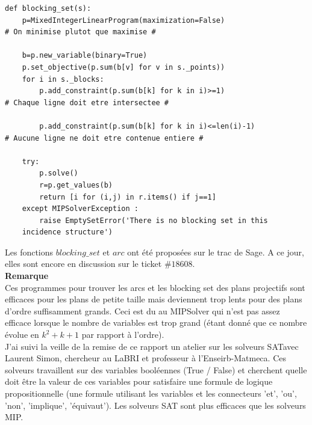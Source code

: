 \documentclass[a4paper]{article}
\begin{document}
\begin{lstlisting}
def blocking_set(s):
    p=MixedIntegerLinearProgram(maximization=False)
# On minimise plutot que maximise #

    b=p.new_variable(binary=True)
    p.set_objective(p.sum(b[v] for v in s._points))
    for i in s._blocks:
        p.add_constraint(p.sum(b[k] for k in i)>=1)
# Chaque ligne doit etre intersectee #

        p.add_constraint(p.sum(b[k] for k in i)<=len(i)-1)
# Aucune ligne ne doit etre contenue entiere #
        
    try:
        p.solve()
        r=p.get_values(b)
        return [i for (i,j) in r.items() if j==1]
    except MIPSolverException :
        raise EmptySetError('There is no blocking set in this
    incidence structure')  
\end{lstlisting}
\vspace{1\baselineskip}
Les fonctions $blocking\_set$ et $arc$ ont été proposées sur le trac de Sage. A ce jour, elles sont encore en discussion sur le ticket $\#18608$.\vspace{3\baselineskip}\\

\textbf{Remarque}\\
Ces programmes pour trouver les arcs et les blocking set des plans projectifs sont efficaces pour les plans de petite taille mais deviennent trop lents pour des plans d'ordre suffisamment grands. Ceci est du au MIPSolver qui n'est pas assez efficace lorsque le nombre de variables est trop grand (étant donné que ce nombre évolue en $k^2 + k + 1$ par rapport à l'ordre).\\
J'ai suivi la veille de la remise de ce rapport un atelier sur les solveurs SATavec Laurent Simon, chercheur au LaBRI et professeur à l'Enseirb-Matmeca. Ces solveurs travaillent sur des variables booléennes (True / False) et cherchent quelle doit être la valeur de ces variables pour satisfaire une formule de logique propositionnelle (une formule utilisant les variables et les connecteurs 'et', 'ou', 'non', 'implique', 'équivaut'). Les solveurs SAT sont plus efficaces que les solveurs MIP.
\newpage
\end{document}
